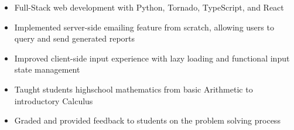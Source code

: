 \documentclass[10pt,a4paper,ragged2e]{altacv}
\begin{document}

\begin{fullwidth}
    \makecvheader
\end{fullwidth}



\begin{itemize}
    \item Full-Stack web development with Python, Tornado, TypeScript, and React
    \item Implemented server-side emailing feature from scratch, allowing users to query and send generated reports
    \item Improved client-side input experience with lazy loading and functional input state management
\end{itemize}

\divider

\begin{itemize}
    \item Taught students highschool mathematics from basic Arithmetic to introductory Calculus
    \item Graded and provided feedback to students on the problem solving process
\end{itemize}


\end{document}
